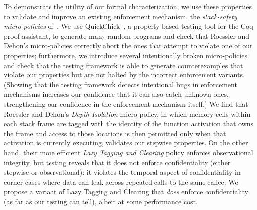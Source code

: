 \documentclass[acmsmall,review,anonymous]{acmart}\settopmatter{printfolios=true,printccs=false,printacmref=false}
\begin{document}
To demonstrate the utility of our formal characterization, we use these
properties to validate and improve an existing enforcement mechanism, the
{\em stack-safety micro-policies} of~\citet{DBLP:conf/sp/RoesslerD18}.  We
use QuickChick~\citep{Denes:VSL2014,Pierce:SF4}, a property-based testing
tool for the Coq proof assistant, to generate many random programs and check
that Roessler and Dehon's micro-policies correctly abort the ones that
attempt to violate one of our properties; furthermore, we introduce several
intentionally broken micro-policies and check that the testing framework is
able to generate counterexamples that violate our properties but are not
halted by the incorrect enforcement variants.  (Showing that the testing
framework detects intentional bugs in enforcement mechanisms increases our
confidence that it can also catch unknown ones, strengthening our confidence
in the enforcement mechanism itself.\ifaftersubmission{}\fi)
%
We find that Roessler and Dehon's {\em Depth Isolation} micro-policy, in
which memory cells within each stack frame are tagged with the identity of
the function activation that owns the frame and access to those locations is
then permitted only when that activation is currently executing, validates our
stepwise properties.  On the other hand, their more efficient \emph{Lazy
  Tagging and Clearing} policy enforces observational integrity, but testing
reveals that it does not enforce confidentiality (either
stepwise or
observational): it violates the temporal aspect of confidentiality in
corner cases where data can leak across repeated calls to the same callee.  We
propose a variant of Lazy Tagging and Clearing that \emph{does} enforce
confidentiality (as far as our testing can tell), albeit at some performance
cost.  
\end{document}
